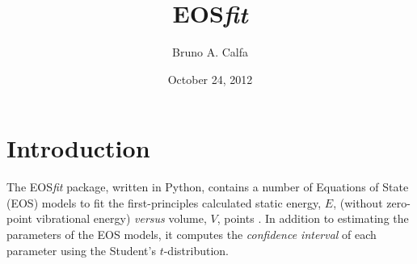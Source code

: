 \documentclass[letter, 12pt]{article}
\title{\textbf{EOS}\textsl{fit}}
\author{Bruno A. Calfa}
\date{October 24, 2012}
\begin{document}
\maketitle
\tableofcontents

\section{Introduction}

The EOS\textsl{fit} package, written in Python, contains a number of Equations of State (EOS) models to fit the first-principles calculated static energy, $E$, (without zero-point vibrational energy) \textit{versus} volume, $V$, points \citep{shang2010}. In addition to estimating the parameters of the EOS models, it computes the \emph{confidence interval} of each parameter using the Student's $t$-distribution.
\end{document}
